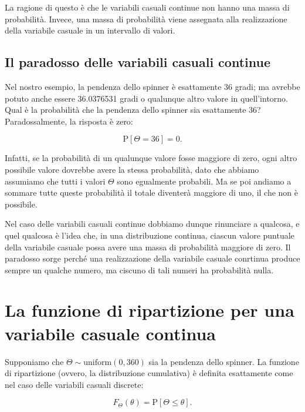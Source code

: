 \documentclass[
  11pt,
]{krantz}
\theoremstyle{definition}
\theoremstyle{definition}
\theoremstyle{definition}
\theoremstyle{definition}
\theoremstyle{remark}
\begin{document}
La ragione di questo è che le variabili casuali continue non hanno una massa di probabilità. Invece, una massa di probabilità viene assegnata alla realizzazione della variabile casuale in un intervallo di valori.

\hypertarget{il-paradosso-delle-variabili-casuali-continue}{%
\subsection{Il paradosso delle variabili casuali continue}\label{il-paradosso-delle-variabili-casuali-continue}}

Nel nostro esempio, la pendenza dello spinner è esattamente 36 gradi; ma avrebbe potuto anche essere 36.0376531 gradi o qualunque altro valore in quell'intorno. Qual è la probabilità che la pendenza dello spinner sia esattamente 36? Paradossalmente, la risposta è zero:

\[
\mbox{P}[\Theta = 36] = 0.
\]

Infatti, se la probabilità di un qualunque valore fosse maggiore di zero, ogni altro possibile valore dovrebbe avere la stessa probabilità, dato che abbiamo assumiamo che tutti i valori \(\Theta\) sono egualmente probabili. Ma se poi andiamo a sommare tutte queste probabilità il totale diventerà maggiore di uno, il che non è possibile.

Nel caso delle variabili casuali continue dobbiamo dunque rinunciare a qualcosa, e quel qualcosa è l'idea che, in una distribuzione continua, ciascun valore puntuale della variabile casuale possa avere una massa di probabilità maggiore di zero. Il paradosso sorge perché una realizzazione della variabile casuale conrtinua produce sempre un qualche numero, ma ciscuno di tali numeri ha probabilità nulla.

\hypertarget{la-funzione-di-ripartizione-per-una-variabile-casuale-continua}{%
\section{La funzione di ripartizione per una variabile casuale continua}\label{la-funzione-di-ripartizione-per-una-variabile-casuale-continua}}

Supponiamo che \(\Theta \sim \mbox{uniform}(0, 360)\) sia la pendenza dello spinner. La funzione di ripartizione (ovvero, la distribuzione cumulativa) è definita esattamente come nel caso delle variabili casuali discrete:

\[
F_{\Theta}(\theta) = \mbox{P}[\Theta \leq \theta].
\]
\end{document}
